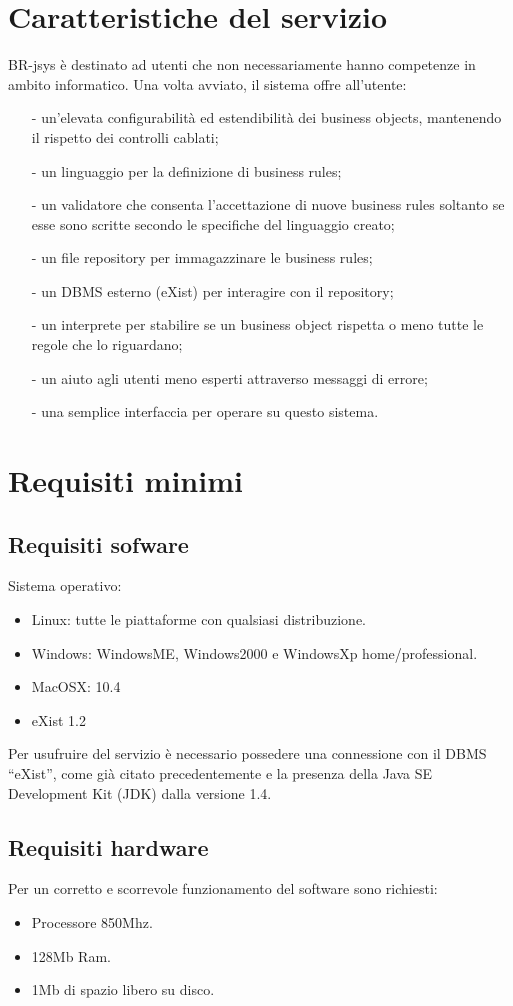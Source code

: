 \section{Caratteristiche del servizio}
BR-jsys \`e destinato ad utenti che non necessariamente hanno competenze in ambito informatico. Una volta avviato, il sistema offre all'utente:
\begin{itemize}
\item[-] un'elevata configurabilit\`a ed estendibilit\`a dei business objects, mantenendo il rispetto dei controlli cablati;
\item[-] un linguaggio per la definizione di business rules;
\item[-] un validatore che consenta l'accettazione di nuove business rules soltanto se esse sono scritte secondo le specifiche del linguaggio creato;
\item[-] un file repository per immagazzinare le business rules;
\item[-] un DBMS esterno (eXist) per interagire con il repository;
\item[-] un interprete per stabilire se un business object rispetta o meno tutte le regole che lo riguardano;
\item[-] un aiuto agli utenti meno esperti attraverso  messaggi di errore;
\item[-] una semplice interfaccia per operare su questo sistema.
\end{itemize}
\section{Requisiti minimi}
\subsection{Requisiti sofware}
Sistema operativo:
\begin{itemize}
\item Linux: tutte le piattaforme con qualsiasi distribuzione.
\item Windows: WindowsME, Windows2000 e WindowsXp home/professional.
\item MacOSX: 10.4
\item eXist 1.2
\end{itemize}
Per usufruire del servizio \`e necessario possedere una connessione con il DBMS ``eXist'', come gi\`a citato precedentemente e la presenza della Java SE Development Kit (JDK) dalla versione 1.4.
\subsection{Requisiti hardware}
Per un corretto e scorrevole funzionamento del software sono richiesti:
\begin{itemize}
\item Processore 850Mhz.
\item 128Mb Ram.
\item 1Mb di spazio libero su disco.
\end{itemize}

